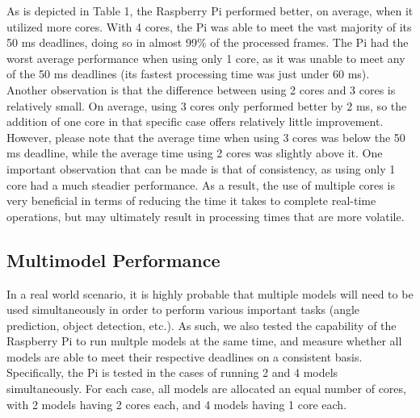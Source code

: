 \documentclass[10pt, conference]{IEEEtran}
\begin{document}
As is depicted in Table 1, the Raspberry Pi performed better, on average, when it utilized more 
cores. With 4 cores, the Pi was able to meet the vast majority of its 50 ms deadlines, doing so in 
almost 99\% of the processed frames. The Pi had the worst average performance when using only 1 core, 
as it was unable to meet any of the 50 ms deadlines (its fastest processing time was just under 60 
ms). Another observation is that the difference between using 2 cores and 3 cores is relatively 
small. On average, using 3 cores only performed better by 2 ms, so the addition of one core in that 
specific case offers relatively little improvement. However, please note that the average time when 
using 3 cores was below the 50 ms deadline, while the average time using 2 cores was slightly above it. 
One important observation that can be made is that of consistency, as using only 1 core had a much 
steadier performance. As a result, the use of multiple cores is very beneficial in terms of reducing 
the time it takes to complete real-time operations, but may ultimately result in processing times 
that are more volatile.

\subsection{Multimodel Performance}
In a real world scenario, it is highly probable that multiple models will need to be used 
simultaneously in order to perform various important tasks (angle prediction, object detection, 
etc.)\cite{}. As such, we also tested the capability of the Raspberry Pi to run multple models at the 
same time, and measure whether all models are able to meet their respective deadlines on a consistent 
basis. Specifically, the Pi is tested in the cases of running 2 and 4 models simultaneously. For each 
case, all models are allocated an equal number of cores, with 2 models having 2 cores each, and 4 
models having 1 core each.
\end{document}
